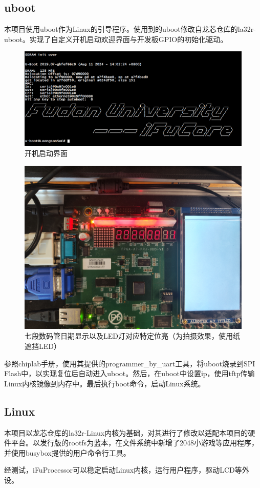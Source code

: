 \documentclass{article}
\begin{document}
\subsection{uboot}
本项目使用uboot作为Linux的引导程序。使用到的uboot修改自龙芯仓库的la32r-uboot。实现了自定义开机启动欢迎界面与开发板GPIO的初始化驱动。\par
\begin{figure}[h]
    \centering
    \includegraphics[width=0.5\linewidth]{./imgs/uboot_hello.png}
    \caption{开机启动界面}
\end{figure}
\begin{figure}[h]
    \centering
    \includegraphics[width=0.5\linewidth]{./imgs/uboot_date.jpg}
    \caption{七段数码管日期显示以及LED灯对应特定位亮（为拍摄效果，使用纸遮挡LED）}
\end{figure}
参照chiplab手册，使用其提供的programmer\_by\_uart工具，将uboot烧录到SPI Flash中，以实现复位后自动进入uboot。然后，在uboot中设置ip，使用tftp传输Linux内核镜像到内存中。最后执行boot命令，启动Linux系统。
\newpage
\subsection{Linux}
本项目以龙芯仓库的la32r-Linux内核为基础，对其进行了修改以适配本项目的硬件平台。以发行版的rootfs为蓝本，在文件系统中新增了2048小游戏等应用程序，并使用busybox提供的用户命令行工具。\par
经测试，iFuProcessor可以稳定启动Linux内核，运行用户程序，驱动LCD等外设。\par
\end{document}
